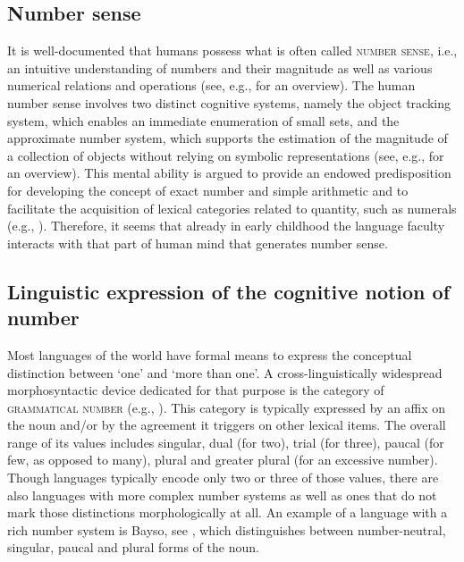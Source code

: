 \documentclass[output=paper]{langscibook}
\begin{document}
\subsection{Number sense}\label{doc-wag:sec:number-sense}

It is well-documented that humans possess what is often called \textsc{number sense}, i.e., an intuitive understanding of numbers and their magnitude as well as various numerical relations and operations (see, e.g., \citealt{dehaene1997number} for an overview). The human number sense involves two distinct cognitive systems, namely the object tracking system, which enables an immediate enumeration of small sets, and the approximate number system, which supports the estimation of the magnitude of a collection of objects without relying on symbolic representations (see, e.g., \citealt{hyde2011two} for an overview). This mental ability is argued to provide an endowed predisposition for developing the concept of exact number and simple arithmetic and to facilitate the acquisition of lexical categories related to quantity, such as numerals (e.g., \citealt{gelman_gallistel1978child, wynn1990children}). Therefore, it seems that already in early childhood the language faculty interacts with that part of human mind that generates number sense. 

\subsection{Linguistic expression of the cognitive notion of number}\label{doc-wag:sec:lingusitic-expression-of-the-cognitive-notion-of-number}

Most languages of the world have formal means to express the conceptual distinction between `one' and `more than one'. A cross-linguistically widespread morphosyntactic device dedicated for that purpose is the category of \textsc{grammatical number} (e.g., \citealt{corbett2000number}). This category is typically expressed by an affix on the noun and/or by the agreement it triggers on other lexical items. The overall range of its values includes singular, dual (for two), trial (for three), paucal (for few, as opposed to many), plural and greater plural (for an excessive number). Though languages typically encode only two or three of those values, there are also languages with more complex number systems as well as ones that do not mark those distinctions morphologically at all. An example of a language with a rich number system is Bayso, see , which distinguishes between number-neutral, singular, paucal and plural forms of the noun.
\end{document}
